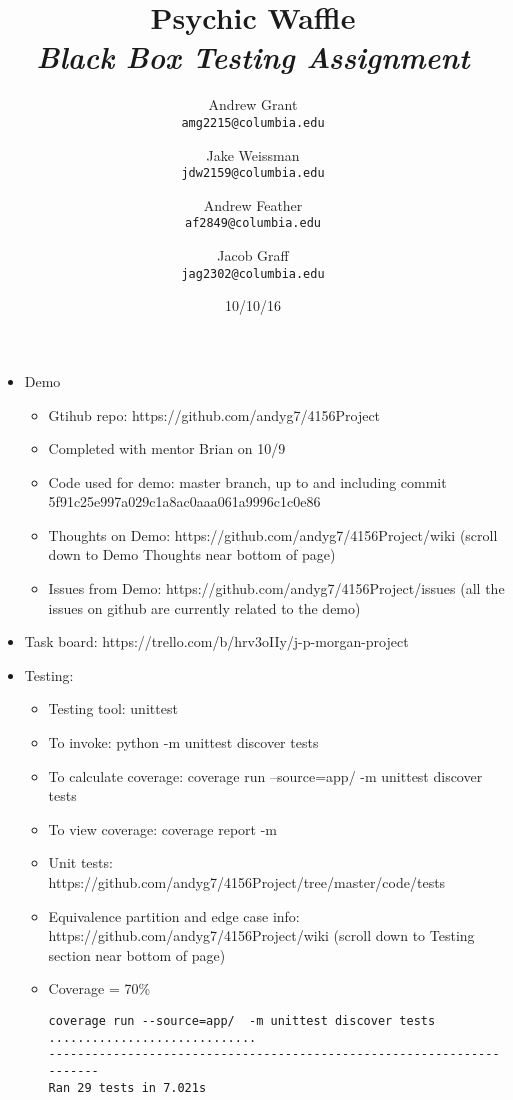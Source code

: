 \documentclass{article}
\title{Psychic Waffle \\
	\textit{Black Box Testing Assignment}}
\author{
    Andrew Grant\\
    \texttt{amg2215@columbia.edu}
    \and
    Jake Weissman\\
    \texttt{jdw2159@columbia.edu}
        \and
    Andrew Feather\\
    \texttt{af2849@columbia.edu}
        \and
    Jacob Graff\\
    \texttt{jag2302@columbia.edu}
}
\date{10/10/16}
\begin{document}
\maketitle

\section{}
\begin{itemize}
\item Demo
\begin{itemize}
\item Gtihub repo: https://github.com/andyg7/4156Project
\item Completed with mentor Brian on 10/9
\item Code used for demo: master branch, up to and including commit 5f91c25e997a029c1a8ac0aaa061a9996c1c0e86
\item Thoughts on Demo: https://github.com/andyg7/4156Project/wiki (scroll down to Demo Thoughts near bottom of page)
\item Issues from Demo: https://github.com/andyg7/4156Project/issues (all the issues on github are currently related to the demo)
\end{itemize}

\item Task board: https://trello.com/b/hrv3oIIy/j-p-morgan-project
\item Testing:
\begin{itemize}
\item Testing tool: unittest
\item To invoke: python -m unittest discover tests
\item To calculate coverage: coverage run --source=app/  -m unittest discover tests
\item To view coverage: coverage report -m
\item Unit tests: https://github.com/andyg7/4156Project/tree/master/code/tests
\item Equivalence partition and edge case info: https://github.com/andyg7/4156Project/wiki (scroll down to Testing section near bottom of page)
\item Coverage = 70\%
\begin{lstlisting}
coverage run --source=app/  -m unittest discover tests
.............................
----------------------------------------------------------------------
Ran 29 tests in 7.021s


\end{lstlisting}
\end{itemize}
\end{itemize}
\end{document}
